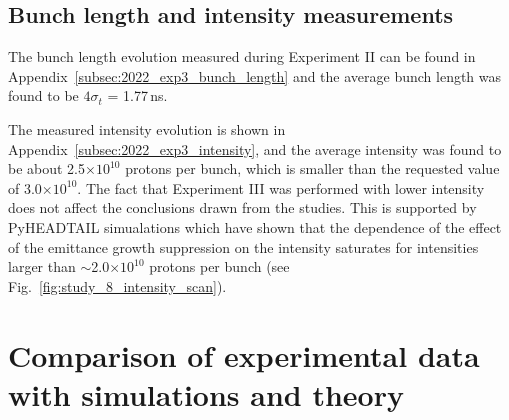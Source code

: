 \subsection{Bunch length and intensity measurements}\label{subsec:bunch_length_intensity_exp3}

The bunch length evolution measured during Experiment II can be found in Appendix~\ref{subsec:2022_exp3_bunch_length} and the average bunch length was found to be $4\sigma_t$ = 1.77\,ns.

The measured intensity evolution is shown in Appendix~\ref{subsec:2022_exp3_intensity}, and the average intensity was found to be about 2.5$\times 10^{10}$ protons per bunch, which is smaller than the requested value of 3.0$\times 10^{10}$. The fact that Experiment III was performed with lower intensity does not affect the conclusions drawn from the studies. This is supported by PyHEADTAIL simualations which have shown that the dependence of the effect of the emittance growth suppression on the intensity saturates for intensities larger than $\sim$2.0$\times 10^{10}$ protons per bunch (see Fig.~\ref{fig:study_8_intensity_scan}). %






\section{Comparison of experimental data with simulations and theory}\label{sec:compare_measurements_pyheadtail_theory}

